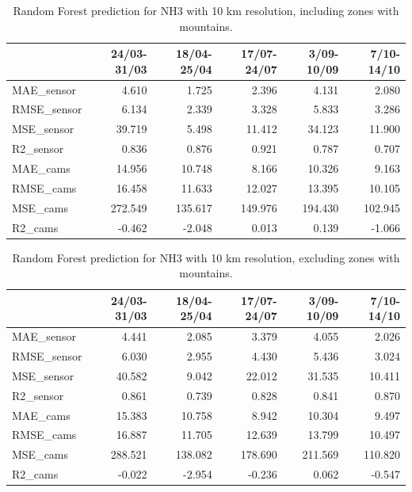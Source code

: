 \begin{table}[H]
\begin{tabular}{lrrrrr}
\toprule
  &  24/03-31/03 &  18/04-25/04 &  17/07-24/07 &  3/09-10/09 &  7/10-14/10 \\
\midrule
 MAE\_sensor &        4.610 &        1.725 &        2.396 &       4.131 &       2.080 \\
RMSE\_sensor &        6.134 &        2.339 &        3.328 &       5.833 &       3.286 \\
 MSE\_sensor &       39.719 &        5.498 &       11.412 &      34.123 &      11.900 \\
  R2\_sensor &        0.836 &        0.876 &        0.921 &       0.787 &       0.707 \\
   MAE\_cams &       14.956 &       10.748 &        8.166 &      10.326 &       9.163 \\
  RMSE\_cams &       16.458 &       11.633 &       12.027 &      13.395 &      10.105 \\
   MSE\_cams &      272.549 &      135.617 &      149.976 &     194.430 &     102.945 \\
    R2\_cams &       -0.462 &       -2.048 &        0.013 &       0.139 &      -1.066 \\
\bottomrule
\end{tabular}
\caption{Random Forest prediction for NH3 with 10 km resolution, including zones with mountains.}
\end{table}

\begin{table}[H]
\begin{tabular}{lrrrrr}
\toprule
  &  24/03-31/03 &  18/04-25/04 &  17/07-24/07 &  3/09-10/09 &  7/10-14/10 \\
\midrule
 MAE\_sensor &        4.441 &        2.085 &        3.379 &       4.055 &       2.026 \\
RMSE\_sensor &        6.030 &        2.955 &        4.430 &       5.436 &       3.024 \\
 MSE\_sensor &       40.582 &        9.042 &       22.012 &      31.535 &      10.411 \\
  R2\_sensor &        0.861 &        0.739 &        0.828 &       0.841 &       0.870 \\
   MAE\_cams &       15.383 &       10.758 &        8.942 &      10.304 &       9.497 \\
  RMSE\_cams &       16.887 &       11.705 &       12.639 &      13.799 &      10.497 \\
   MSE\_cams &      288.521 &      138.082 &      178.690 &     211.569 &     110.820 \\
    R2\_cams &       -0.022 &       -2.954 &       -0.236 &       0.062 &      -0.547 \\
\bottomrule
\end{tabular}
\caption{Random Forest prediction for NH3 with 10 km resolution, excluding zones with mountains.}
\end{table}

